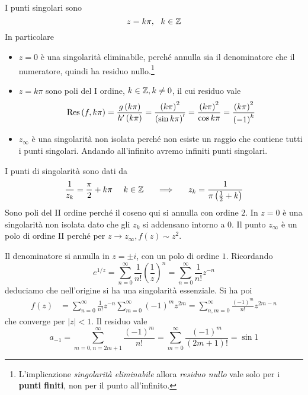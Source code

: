 I punti singolari sono
\begin{equation*}
z = k\pi ,\ \ k\in \ZZ 
\end{equation*}
In particolare
\begin{itemize}
\item $z = 0$ è una singolarità eliminabile, perché annulla sia il denominatore che il numeratore, quindi ha residuo nullo.\footnote{L'implicazione \textit{singolarità eliminabile} allora \textit{residuo nullo} vale solo per i \textbf{punti finiti}, non per il punto all'infinito.}
\item $z = k\pi $ sono poli del I ordine, $k\in \mathbb{Z}  ,k\neq 0$, il cui residuo vale\begin{equation*}
\operatorname{Res} \left(f,k\pi \right) = \frac{g\left(k\pi \right)}{h'\left(k\pi \right)} = \frac{\left(k\pi \right)^{2}}{\left(\sin k\pi \right) '} = \frac{\left(k\pi \right)^{2}}{\cos k\pi } = \frac{\left(k\pi \right)^{2}}{\left(- 1\right)^{k}}
\end{equation*}
\item $z_{\infty }$ è una singolarità non isolata perché non esiste un raggio che contiene tutti i punti singolari. Andando all'infinito avremo infiniti punti singolari.
\end{itemize}
\Soluzione

I punti di singolarità sono dati da
\begin{equation*}
\frac{1}{z_{k}} = \frac{\pi }{2} + k\pi \ \ \ \ k\in \ZZ  \ \ \ \ \implies \ \ \ \ z_{k} = \frac{1}{\pi \left(\frac{1}{2} + k\right)}
\end{equation*}
Sono poli del II ordine perché il coseno qui si annulla con ordine $2$. In $z = 0$ è una singolarità non isolata dato che gli $z_{k}$ si addensano intorno a $0$. Il punto $z_{\infty }$ è un polo di ordine II perché per $z\rightarrow z_{\infty } ,f\left(z\right) \sim z^{2}$.
\Soluzione

Il denominatore si annulla in $z = \pm i$, con un polo di ordine $1$. Ricordando
\begin{equation*}
e^{1/z} = \sum\limits ^{\infty }_{n = 0}\frac{1}{n!}\left(\frac{1}{z}\right)^{n} = \sum\limits ^{\infty }_{n = 0}\frac{1}{n!} z^{ - n}
\end{equation*}
deduciamo che nell'origine si ha una singolarità essenziale. Si ha poi
\begin{align*}
f\left(z\right) & = \sum\limits ^{\infty }_{n = 0}\frac{1}{n!} z^{ - n}\sum\limits ^{\infty }_{m = 0}\left(- 1\right)^{m} z^{2m} = \sum\limits ^{\infty }_{n,m = 0}\frac{\left(- 1\right)^{m}}{n!} z^{2m - n}
\end{align*}
che converge per $\left| z\right| < 1$. Il residuo vale
\begin{equation*}
a_{ - 1} = \sum\limits ^{\infty }_{m = 0,n = 2m + 1}\frac{\left(- 1\right)^{m}}{n!} = \sum\limits ^{\infty }_{m = 0}\frac{\left(- 1\right)^{m}}{\left(2m + 1\right) !} = \sin 1
\end{equation*}
\Soluzione

